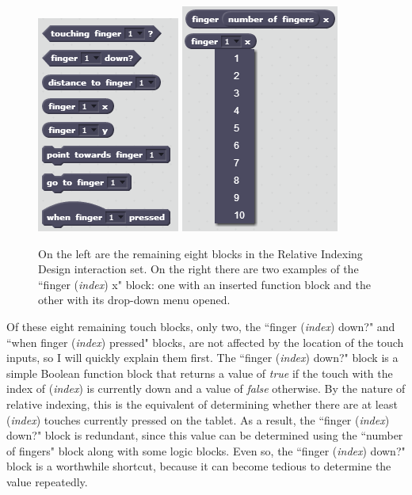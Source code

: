 \begin{figure}
\centering
\includegraphics{images/Relative_Indexing_Design_Block_Set.PNG}
\includegraphics{images/Relative_Indexing_Design_Block_Dropdown_Show.PNG}
\caption[Remaining Eight Blocks in the Relative Indexing Design Interaction Set]{On the left are the remaining eight blocks in the Relative Indexing Design interaction set.  On the right there are two examples of the ``finger (\emph{index}) x" block: one with an inserted function block and the other with its drop-down menu opened.}
\label{Relative_Indexing_Design_Block_Set}
\end{figure}

Of these eight remaining touch blocks, only two, the ``finger (\emph{index}) down?" and ``when finger (\emph{index}) pressed" blocks, are not affected by the location of the touch inputs, so I will quickly explain them first. The ``finger (\emph{index}) down?" block is a simple Boolean function block that returns a value of \emph{true} if the touch with the index of (\emph{index}) is currently down and a value of \emph{false} otherwise. By the nature of relative indexing, this is the equivalent of determining whether
there are at least (\emph{index}) touches currently pressed on the tablet. As a result, the ``finger (\emph{index}) down?" block is redundant, since this value can be determined using the ``number of fingers" block along with some logic blocks. Even so, the ``finger (\emph{index}) down?" block is a worthwhile shortcut, because it can become tedious to determine the value repeatedly.

